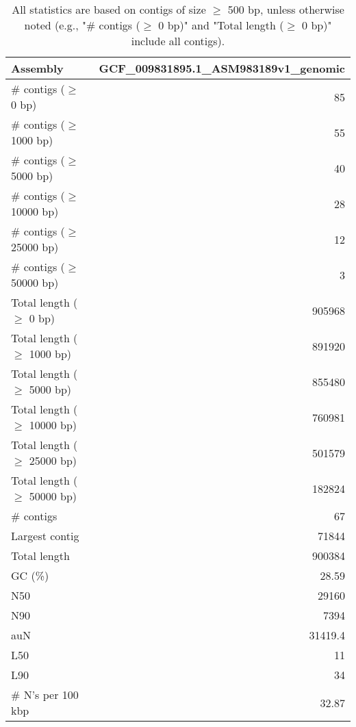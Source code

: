 \documentclass[12pt,a4paper]{article}
\begin{document}
\begin{table}[ht]
\begin{center}
\caption{All statistics are based on contigs of size $\geq$ 500 bp, unless otherwise noted (e.g., "\# contigs ($\geq$ 0 bp)" and "Total length ($\geq$ 0 bp)" include all contigs).}
\begin{tabular}{|l*{1}{|r}|}
\hline
Assembly & GCF\_009831895.1\_ASM983189v1\_genomic \\ \hline
\# contigs ($\geq$ 0 bp) & 85 \\ \hline
\# contigs ($\geq$ 1000 bp) & 55 \\ \hline
\# contigs ($\geq$ 5000 bp) & 40 \\ \hline
\# contigs ($\geq$ 10000 bp) & 28 \\ \hline
\# contigs ($\geq$ 25000 bp) & 12 \\ \hline
\# contigs ($\geq$ 50000 bp) & 3 \\ \hline
Total length ($\geq$ 0 bp) & 905968 \\ \hline
Total length ($\geq$ 1000 bp) & 891920 \\ \hline
Total length ($\geq$ 5000 bp) & 855480 \\ \hline
Total length ($\geq$ 10000 bp) & 760981 \\ \hline
Total length ($\geq$ 25000 bp) & 501579 \\ \hline
Total length ($\geq$ 50000 bp) & 182824 \\ \hline
\# contigs & 67 \\ \hline
Largest contig & 71844 \\ \hline
Total length & 900384 \\ \hline
GC (\%) & 28.59 \\ \hline
N50 & 29160 \\ \hline
N90 & 7394 \\ \hline
auN & 31419.4 \\ \hline
L50 & 11 \\ \hline
L90 & 34 \\ \hline
\# N's per 100 kbp & 32.87 \\ \hline
\end{tabular}
\end{center}
\end{table}
\end{document}
